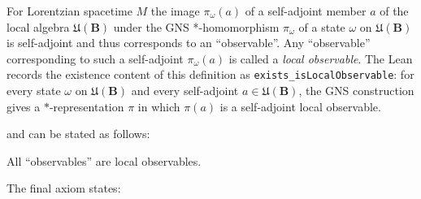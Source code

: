 \begin{definition}
    \label{def:local-observable}
    \leanok
    For Lorentzian spacetime $M$ the image $\pi_\omega(a)$ of a self-adjoint member $a$ of the local algebra $\mathfrak{U}(\mathbf{B})$ under the GNS *-homomorphism $\pi_\omega$ of a state $\omega$ on $\mathfrak{U}(\mathbf{B})$ is self-adjoint and thus corresponds to an ``observable''. Any ``observable'' corresponding to such a self-adjoint $\pi_\omega(a)$ is called a \textit{local observable}. The Lean records the existence content of this definition as \texttt{exists\_isLocalObservable}: for every state $\omega$ on $\mathfrak{U}(\mathbf{B})$ and every self-adjoint $a \in \mathfrak{U}(\mathbf{B})$, the GNS construction gives a $*$-representation $\pi$ in which $\pi(a)$ is a self-adjoint local observable.
\end{definition}

and can be stated as follows:

\begin{definition}
    \label{def:local-completeness-in-curved-spacetime}
    \leanok
    All ``observables'' are local observables.
\end{definition}

The final axiom states:

